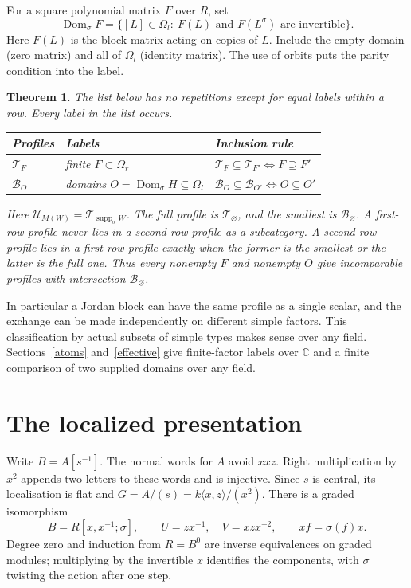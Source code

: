 \documentclass[11pt]{article}
\newtheorem{theorem}{Theorem}
\newcommand{\supp}{\operatorname{supp}_{\sigma}}
\newcommand{\Dom}{\operatorname{Dom}_{\sigma}}
\newcommand{\prof}{\mathcal U}
\newcommand{\bb}{\mathcal B}
\newcommand{\ttt}{\mathcal T}
\begin{document}
For a square polynomial matrix $F$ over $R$, set
\[
 \Dom F=\{[L]\in\Omega_l:\ F(L)\text{ and }F(L^\sigma)
                      \text{ are invertible}\}.
\]
Here $F(L)$ is the block matrix acting on copies of $L$. Include the
empty domain (zero matrix) and all of $\Omega_l$ (identity matrix).
The use of orbits puts the parity condition into the label.

\begin{theorem}\label{poset}
The list below has no repetitions except for equal labels within a row.
Every label in the list occurs.
\begin{center}
\begin{tabular}{lll}
\toprule
Profiles & Labels & Inclusion rule\\
\midrule
$\ttt_F$ & finite $F\subset\Omega_r$ & $\ttt_F\subseteq\ttt_{F'}\iff F\supseteq F'$\\
$\bb_O$ & domains $O=\Dom H\subseteq\Omega_l$ &
$\bb_O\subseteq\bb_{O'}\iff O\subseteq O'$\\
\bottomrule
\end{tabular}
\end{center}
Here $\prof_{M(W)}=\ttt_{\supp W}$. The full profile is $\ttt_\varnothing$,
and the smallest is $\bb_\varnothing$. A first-row profile never lies
in a second-row profile as a subcategory. A second-row profile lies
in a first-row profile exactly when the former is the smallest or the
latter is the full one. Thus every nonempty $F$ and nonempty $O$ give
incomparable profiles with intersection $\bb_\varnothing$.
\end{theorem}

In particular a Jordan block can have the same profile as a single scalar,
and the exchange can be made independently on different simple factors.
This classification by actual subsets of simple types makes sense over
any field. Sections~\ref{atoms} and~\ref{effective} give finite-factor labels over
$\mathbb C$ and a finite comparison of two supplied domains over any field.

\section{The localized presentation}
Write $B=A[s^{-1}]$. The normal words for $A$ avoid $xxz$.
Right multiplication by $x^2$ appends two letters to these words and is
injective. Since $s$ is central, its localisation is flat and
$G=A/(s)=k\langle x,z\rangle/(x^2)$. There is a graded isomorphism
\[
 B=R[x,x^{-1};\sigma],\qquad U=zx^{-1},\quad V=xzx^{-2},
 \qquad x f=\sigma(f)x .
\]
Degree zero and induction from $R=B^0$ are inverse equivalences on
graded modules; multiplying by the invertible $x$ identifies the
components, with $\sigma$ twisting the action after one step.
\end{document}
